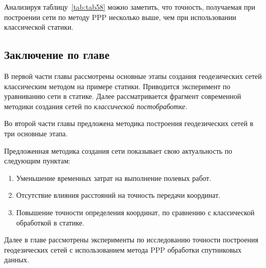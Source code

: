 Анализируя таблицу~\cref{tab:tab58} можно заметить, что точность, получаемая при построении сети по методу PPP несколько выше, чем при использовании классической статики.

  
\subsection{Заключение по главе}\label{subsec:ch3/sec3/sub6}

 В первой части главы рассмотрены основные этапы создания геодезических сетей классическим методом на примере статики. Приводится эксперимент по уравниванию сети в статике. Далее рассматривается фрагмент современной методики создания сетей по \textit{классической постобработке}.
 
 Во второй части главы предложена методика построения геодезических сетей в три основные этапа.
 
 Предложенная методика создания сети показывает свою актуальность по следующим пунктам:
 \begin{enumerate}
 	\item Уменьшение временных затрат на выполнение полевых работ.
 	\item Отсутствие влияния расстояний на точность передачи координат.
 	\item Повышение точности определения координат, по сравнению с классической обработкой в статике.
 \end{enumerate}
 
 Далее в главе рассмотрены эксперименты по исследованию точности построения геодезических сетей с использованием метода PPP обработки спутниковых данных.


\fi %